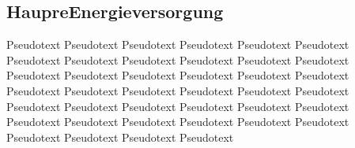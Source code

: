 \subsection{HaupreEnergieversorgung}
Pseudotext Pseudotext Pseudotext Pseudotext Pseudotext Pseudotext Pseudotext Pseudotext Pseudotext Pseudotext Pseudotext Pseudotext Pseudotext Pseudotext Pseudotext Pseudotext Pseudotext Pseudotext Pseudotext Pseudotext Pseudotext Pseudotext Pseudotext Pseudotext Pseudotext Pseudotext Pseudotext Pseudotext Pseudotext Pseudotext Pseudotext Pseudotext Pseudotext Pseudotext Pseudotext Pseudotext Pseudotext Pseudotext Pseudotext Pseudotext 